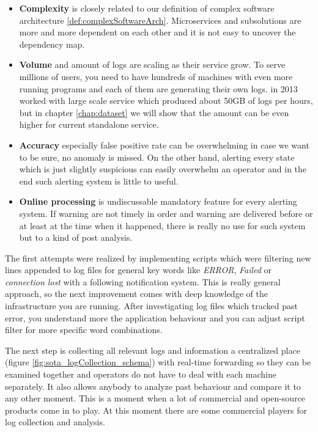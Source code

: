 \begin{itemize}
    \item \textbf{Complexity} is closely related to our definition of complex software architecture \ref{def:complexSoftwareArch}. Microservices and subsolutions are more and more dependent on each other and it is not easy to uncover the dependency map. 
    \item \textbf{Volume} and amount of logs are scaling as their service grow. To serve millions of users, you need to have hundreds of machines with even more running programs and each of them are generating their own logs. \cite{mi2013toward} in 2013 worked with large scale service which produced about 50GB of logs per hours, but in chapter \ref{chap:dataset} we will show that the amount can be even higher for current standalone service.
    \item \textbf{Accuracy} especially false positive rate can be overwhelming in case we want to be sure, no anomaly is missed. On the other hand, alerting every state which is just slightly suspicious can easily overwhelm an operator and in the end such alerting system is little to useful. 
    \item \textbf{Online processing } is undiscussable mandatory feature for every alerting system. If warning are not timely in order and warning are delivered before or at least at the time when it happened, there is really no use for such system but to a kind of post analysis.
\end{itemize}

The first attempts were realized by implementing scripts which were filtering new lines appended to log files for general key words like \textit{ERROR}, \textit{Failed} or \textit{connection lost} with a following notification system. This is really general approach, so the next improvement comes with deep knowledge of the infrastructure you are running. After investigating log files which tracked past error, you understand more the application behaviour and you can adjust script filter for more specific word combinations.

The next step is collecting all relevant logs and information a centralized place \cite{rabkin2010chukwa}(figure \ref{fig:sota_logCollection_schema}) with real-time forwarding so they can be examined together and operators do not have to deal with each machine separately. It also allows anybody to analyze past behaviour and compare it to any other moment. This is a moment when a lot of commercial and open-source products come in to play. At this moment there are some commercial players for log collection and analysis.

